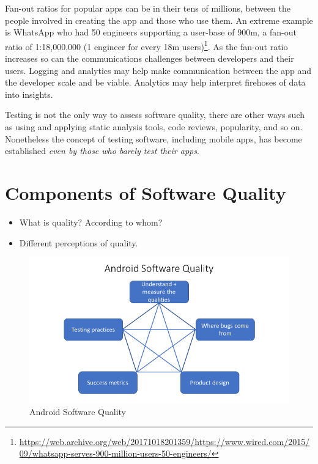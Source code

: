 Fan-out ratios for popular apps can be in their tens of millions, between the people involved in creating the app and those who use them. An extreme example is WhatsApp who had 50 engineers supporting a user-base of 900m, a fan-out ratio of 1:18,000,000 (1 engineer for every 18m users)\footnote{\url{https://web.archive.org/web/20171018201359/https://www.wired.com/2015/09/whatsapp-serves-900-million-users-50-engineers/}}. As the fan-out ratio increases so can the communications challenges between developers and their users. Logging and analytics may help make communication between the app and the developer scale and be viable. Analytics may help interpret firehoses of data into insights. 

Testing is not the only way to assess software quality, there are other ways such as using and applying static analysis tools, code reviews, popularity, and so on. Nonetheless the concept of testing software, including mobile apps, has become established \textit{even by those who barely test their apps}.

\section{Components of Software Quality}

\begin{itemize}
    \item What is quality? According to whom? 
    \item Different perceptions of quality.
\end{itemize}

\begin{figure}
    \centering
    \includegraphics[width=\columnwidth]{images/Android_Software_Quality.png}
    \caption{Android Software Quality}
    \label{fig:android_software_quality}
\end{figure}

